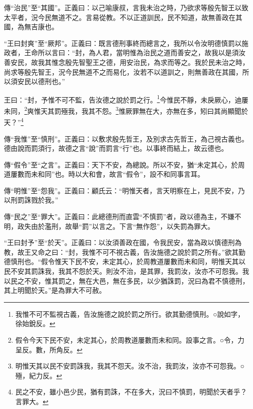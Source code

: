 {\noindent\zhuan{}\fzbyks 傳“治民”至“其國”。正義曰：以己喻康叔，言我未治之時，乃欲求等殷先智王以致太平者，況今民無道不之。言易從教。不以正道訓民，民不知道，故無善政在其國，為無吉康也。 \par}

{\noindent\shu{}\fzkt “王曰封爽”至“厥邦”。正義曰：既言德刑事終而總言之，我所以令汝明德慎罰以施政者，王命所以言曰：“封，為人君，當明惟為治民之道而善安之，故我以是須汝善安民，故我其惟念殷先智聖王之德，用安治民，為求而等之。我於民未治之時，尚求等殷先智王，況今民無道不之而易化，汝若不以道訓之，則無善政在其國，所以須安民以德刑也。” \par}

王曰：“封，予惟不可不監，告汝德之說於罰之行。\footnote{我惟不可不監視古義，告汝施德之說於罰之所行。欲其勤德慎刑。○說如字，徐始銳反。}今惟民不靜，未戾厥心，迪屢未同，\footnote{假令今天下民不安，未定其心，於周教道屢數而未和同。設事之言。○令，力呈反。數，所角反。}爽惟天其罰殛我，我其不怨。\footnote{明惟天其以民不安罰誅我，我其不怨天。汝不治，我罰汝，汝亦不可怨我。○殛，紀力反。}惟厥罪無在大，亦無在多，矧曰其尚顯聞於天？”\footnote{民之不安，雖小邑少民，猶有罰誅，不在多大，況曰不慎罰，明聞於天者乎？言罪大。}


{\noindent\zhuan{}\fzbyks 傳“我惟”至“慎刑”。正義曰：以敷求殷先哲王，及別求古先哲王，為己視古義也。德由說而罰須行，故德之言“說”而罰言“行”也。以事終而結上，故云德也。 \par}

{\noindent\zhuan{}\fzbyks 傳“假令”至“之言”。正義曰：天下不安，為總說。所以不安，猶“未定其心，於周道屢數而未和同”也。時以大和會，故言“假令”，設不和同事言耳。 \par}

{\noindent\zhuan{}\fzbyks 傳“明惟”至“怨我”。正義曰：顧氏云：“明惟天者，言天明察在上，見民不安，乃以刑罰誅戮於我。” \par}

{\noindent\zhuan{}\fzbyks 傳“民之”至“罪大”。正義曰：此總德刑而直雲“不慎罰”者，政以德為主，不嫌不明，政失由於濫刑，故舉“罰”以言之。下言“無作怨”，以失罰為罪大。 \par}

{\noindent\shu{}\fzkt “王曰封予”至“於天”。正義曰：以汝須善政在國，令我民安，當為政以慎德刑為教，故王又命之曰：“封，我惟不可不視古義，告汝施德之說於罰之所有。”欲其勤德慎刑也。“假令惟天下民不安，未定其心，於周教道屢數而未和同，明惟天其以民不安其罰誅我，我其不怨於天。則汝不治，是其罪，我罰汝，汝亦不可怨我。我以民之不安，惟其罰之，無在大邑，無在多民，以少猶誅罰，況曰為君不慎德刑，其上明聞於天。”是為罪大不可赦。 \par}

